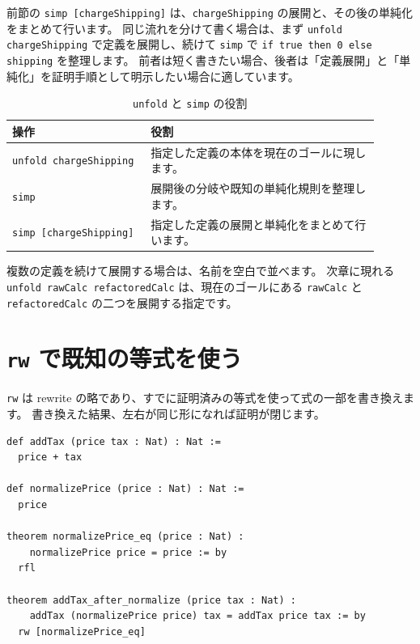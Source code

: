 前節の \texttt{simp [chargeShipping]} は、\texttt{chargeShipping} の展開と、その後の単純化をまとめて行います。
同じ流れを分けて書く場合は、まず \texttt{unfold chargeShipping} で定義を展開し、続けて \texttt{simp} で \texttt{if true then 0 else shipping} を整理します。
前者は短く書きたい場合、後者は「定義展開」と「単純化」を証明手順として明示したい場合に適しています。

\begin{table}[htbp]
\centering
\caption{\texttt{unfold} と \texttt{simp} の役割}
\label{tab:ch08-unfold-simp}
\begin{tabular}{p{0.34\linewidth}p{0.56\linewidth}}
\toprule
操作 & 役割 \\
\midrule
\texttt{unfold chargeShipping} & 指定した定義の本体を現在のゴールに現します。 \\
\texttt{simp} & 展開後の分岐や既知の単純化規則を整理します。 \\
\texttt{simp [chargeShipping]} & 指定した定義の展開と単純化をまとめて行います。 \\
\bottomrule
\end{tabular}
\end{table}

複数の定義を続けて展開する場合は、名前を空白で並べます。
次章に現れる \texttt{unfold rawCalc refactoredCalc} は、現在のゴールにある \texttt{rawCalc} と \texttt{refactoredCalc} の二つを展開する指定です。

\section{\texttt{rw} で既知の等式を使う}

\texttt{rw} は rewrite の略であり、すでに証明済みの等式を使って式の一部を書き換えます。
書き換えた結果、左右が同じ形になれば証明が閉じます。

\begin{listing}[htbp]
\begin{verbatim}
def addTax (price tax : Nat) : Nat :=
  price + tax

def normalizePrice (price : Nat) : Nat :=
  price

theorem normalizePrice_eq (price : Nat) :
    normalizePrice price = price := by
  rfl

theorem addTax_after_normalize (price tax : Nat) :
    addTax (normalizePrice price) tax = addTax price tax := by
  rw [normalizePrice_eq]
\end{verbatim}
\caption{\texttt{addTax\_after\_normalize}}
\label{lst:ch08_rw}
\end{listing}

